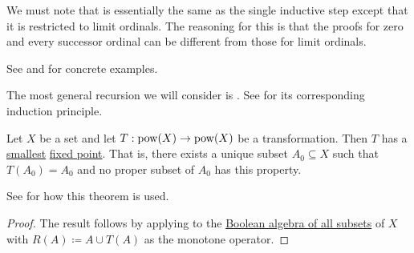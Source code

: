 \begin{remark}
  We must note that  is essentially the same as the single inductive step  except that it is restricted to limit ordinals. The reasoning for this is that the proofs for zero and every successor ordinal can be different from those for limit ordinals.

  See  and  for concrete examples.
\end{remark}

\begin{theorem}\label{thm:structural_recursion}
  The most general recursion we will consider is . See  for its corresponding induction principle.

  Let \( X \) be a set and let \( T: \operatorname{pow}(X) \to \operatorname{pow}(X) \) be a transformation. Then \( T \) has a \hyperref[def:poset_extremal_points/maximum_and_minimum]{smallest} \hyperref[def:fixed_point]{fixed point}. That is, there exists a unique subset \( A_0 \subseteq X \) such that \( T(A_0) = A_0 \) and no proper subset of \( A_0 \) has this property.

  See  for how this theorem is used.
\end{theorem}
\begin{proof}
  The result follows by applying  to the \hyperref[thm:boolean_algebra_of_subsets]{Boolean algebra of all subsets} of \( X \) with \( R(A) \coloneqq A \cup T(A) \) as the monotone operator.
\end{proof}

